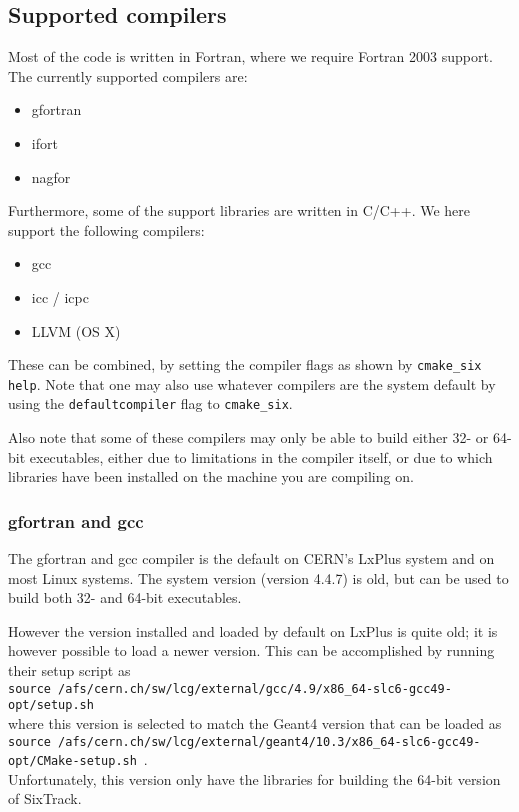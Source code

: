 \documentclass[english]{article}
\begin{document}
\subsection{Supported compilers}
Most of the code is written in Fortran, where we require Fortran 2003 support.
The currently supported compilers are:
\begin{itemize}
\item gfortran
\item ifort
\item nagfor
\end{itemize}
Furthermore, some of the support libraries are written in C/C++.
We here support the following compilers:
\begin{itemize}
\item gcc
\item icc / icpc
\item LLVM (OS X)
\end{itemize}
These can be combined, by setting the compiler flags as shown by \texttt{cmake\_six help}.
Note that one may also use whatever compilers are the system default by using the \texttt{defaultcompiler} flag to \texttt{cmake\_six}.

Also note that some of these compilers may only be able to build either 32- or 64-bit executables, either due to limitations in the compiler itself, or due to which libraries have been installed on the machine you are compiling on.

\subsubsection{gfortran and gcc}
The gfortran and gcc compiler is the default on CERN's LxPlus system and on most Linux systems.
The system version (version 4.4.7) is old, but can be used to build both 32- and 64-bit executables.

However the version installed and loaded by default on LxPlus is quite old; it is however possible to load a newer version.
This can be accomplished by running their setup script as\\
{\scriptsize
  \texttt{source /afs/cern.ch/sw/lcg/external/gcc/4.9/\-x86\_64\--slc6\--gcc49\--opt/\-setup.sh}\\
}
where this version is selected to match the Geant4 version that can be loaded as
{\scriptsize
  \texttt{source /afs/cern.ch/sw/lcg/external/geant4/10.3/x86\_64\--slc6\--gcc49\--opt/\-CMake-setup.sh}~.\\
}
Unfortunately, this version only have the libraries for building the 64-bit version of SixTrack.
\end{document}
